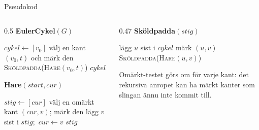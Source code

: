 \begin{frame}{Pseudokod}
\begin{columns}[T]
\begin{column}{0.5\textwidth}
{\small\bfseries\color{kthnavy}EulerCykel$(G)$}
\footnotesize
\begin{algorithmic}[1]
\State $\mathit{cykel}\gets[v_0]$
\State välj en kant $(v_0,t)$ och märk den
\State \textsc{Sköldpadda}(\textsc{Hare}$(v_0,t)$)
\State \Return $\mathit{cykel}$
\end{algorithmic}
\medskip
{\small\bfseries\color{kthorange}Hare$(\mathit{start},\mathit{cur})$}
\footnotesize
\begin{algorithmic}[1]
\State $\mathit{stig}\gets[\mathit{cur}]$
  \State välj en omärkt kant $(\mathit{cur},v)$; märk den
  \State lägg $v$ sist i $\mathit{stig}$;\ $\mathit{cur}\gets v$
\EndWhile
\State \Return $\mathit{stig}$
\end{algorithmic}
\end{column}
\begin{column}{0.47\textwidth}
{\small\bfseries\color{kthgreen}Sköldpadda$(\mathit{stig})$}
\footnotesize
\begin{algorithmic}[1]
  \State lägg $u$ sist i $\mathit{cykel}$
      \State märk $(u,v)$
      \State \textsc{Sköldpadda}(\textsc{Hare}$(u,v)$)
    \EndIf
  \EndFor
\EndFor
\end{algorithmic}
\medskip
\begin{infobox}[fontupper=\footnotesize]
Omärkt-testet görs om för varje kant: det rekursiva anropet kan ha märkt kanter som slingan
ännu inte kommit till.
\end{infobox}
\end{column}
\end{columns}
\end{frame}



